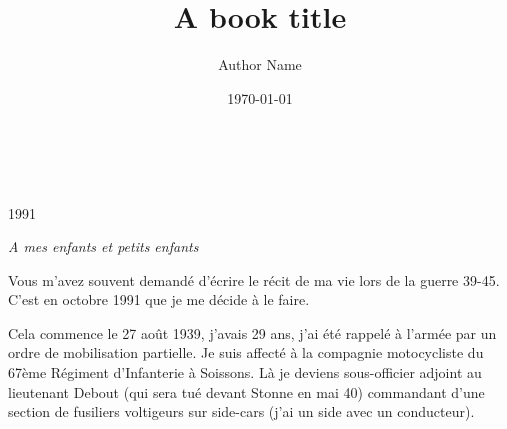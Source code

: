 \documentclass[a5paper,pagesize,10pt,bibtotoc,pointlessnumbers,
normalheadings,DIV=9,twoside=false]{scrbook}
\title{A book title}
\author{Author Name}
\date{\today}
\begin{document}
	
	
	\begin{titlepage}
		\\
		
		\vspace{10mm}
		\\
		
		\vspace{\fill}
		\centering \large{1991}
	\end{titlepage}
	
	
	\newpage{}
	\thispagestyle {empty}
	
	\vspace*{2cm}
	
	\begin{center}
		\Large{\parbox{10cm}{
				\begin{raggedright}
					{\Large 
						\textit{A mes enfants et petits enfants}
					}
					
				\end{raggedright}
			}
		}
	\end{center}
	
	\newpage
	
	
	
	Vous m’avez souvent demandé d’écrire le récit de ma vie lors de la guerre 39-45. 
	C’est en octobre 1991 que je me décide à le faire. 
	
	\medskip
	
	Cela commence le 27 août 1939, j’avais 29 ans, j’ai été rappelé à l’armée par un ordre de mobilisation partielle.
	Je suis affecté à la compagnie motocycliste du 67ème Régiment d’Infanterie à Soissons. Là je deviens sous-officier adjoint au lieutenant Debout (qui sera tué devant Stonne en mai 40) commandant d’une section de fusiliers voltigeurs sur side-cars (j’ai un side avec un conducteur).
	
\end{document}
